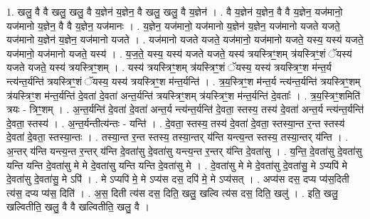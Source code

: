 \documentclass[17pt]{extarticle}
\begin{document}
1. खलु॒ वै वै खलु॒ खलु॒ वै य॒ज्ञेन॑ य॒ज्ञेन॒ वै खलु॒ खलु॒ वै य॒ज्ञेन॑ । . वै य॒ज्ञेन॑ य॒ज्ञेन॒ वै वै य॒ज्ञेन॒ यज॑मानो॒ यज॑मानो य॒ज्ञेन॒ वै वै य॒ज्ञेन॒ यज॑मानः । . य॒ज्ञेन॒ यज॑मानो॒ यज॑मानो य॒ज्ञेन॑ य॒ज्ञेन॒ यज॑मानो यजते यजते॒ यज॑मानो य॒ज्ञेन॑ य॒ज्ञेन॒ यज॑मानो यजते । . यज॑मानो यजते यजते॒ यज॑मानो॒ यज॑मानो यजते॒ यस्य॒ यस्य॑ यजते॒ यज॑मानो॒ यज॑मानो यजते॒ यस्य॑ । . य॒ज॒ते॒ यस्य॒ यस्य॑ यजते यजते॒ यस्य॑ त्रयस्त्रिꣳ॒॒शम् त्र॑यस्त्रिꣳ॒॒शं ॅयस्य॑ यजते यजते॒ यस्य॑ त्रयस्त्रिꣳ॒॒शम् । . यस्य॑ त्रयस्त्रिꣳ॒॒शम् त्र॑यस्त्रिꣳ॒॒शं ॅयस्य॒ यस्य॑ त्रयस्त्रिꣳ॒॒श म॑न्त॒र्य न्त्य॑न्त॒र्यन्ति॑ त्रयस्त्रिꣳ॒॒शं ॅयस्य॒ यस्य॑ त्रयस्त्रिꣳ॒॒श म॑न्त॒र्यन्ति॑ । . त्र॒य॒स्त्रिꣳ॒॒श म॑न्त॒र्य न्त्य॑न्त॒र्यन्ति॑ त्रयस्त्रिꣳ॒॒शम् त्र॑यस्त्रिꣳ॒॒श म॑न्त॒र्यन्ति॑ दे॒वता॑ दे॒वता॑ अन्त॒र्यन्ति॑ त्रयस्त्रिꣳ॒॒शम् त्र॑यस्त्रिꣳ॒॒श म॑न्त॒र्यन्ति॑ दे॒वताः᳚ । . त्र॒य॒स्त्रिꣳ॒॒शमिति॑ त्रयः - त्रिꣳ॒॒शम् । . अ॒न्त॒र्यन्ति॑ दे॒वता॑ दे॒वता॑ अन्त॒र्य न्त्य॑न्त॒र्यन्ति॑ दे॒वता॒ स्तस्य॒ तस्य॑ दे॒वता॑ अन्त॒र्य न्त्य॑न्त॒र्यन्ति॑ दे॒वता॒ स्तस्य॑ । . अ॒न्त॒र्यन्तीत्य॑न्तः - यन्ति॑ । . दे॒वता॒ स्तस्य॒ तस्य॑ दे॒वता॑ दे॒वता॒ स्तस्या॒न्त र॒न्त स्तस्य॑ दे॒वता॑ दे॒वता॒ स्तस्या॒न्तः । . तस्या॒न्त र॒न्त स्तस्य॒ तस्या॒न्तर् य॑न्ति यन्त्य॒न्त स्तस्य॒ तस्या॒न्तर् य॑न्ति । . अ॒न्तर् य॑न्ति यन्त्य॒न्त र॒न्तर् य॑न्ति दे॒वता॑सु दे॒वता॑सु यन्त्य॒न्त र॒न्तर् य॑न्ति दे॒वता॑सु । . य॒न्ति॒ दे॒वता॑सु दे॒वता॑सु यन्ति यन्ति दे॒वता॑सु मे मे दे॒वता॑सु यन्ति यन्ति दे॒वता॑सु मे । . दे॒वता॑सु मे मे दे॒वता॑सु दे॒वता॑सु॒ मे ऽप्यपि॑ मे दे॒वता॑सु दे॒वता॑सु॒ मे ऽपि॑ । . मे ऽप्यपि॑ मे॒ मे ऽप्य॑स दस॒ दपि॑ मे॒ मे ऽप्य॑सत् । . अप्य॑स दस॒ दप्य प्य॑स॒दिती त्य॑स॒ दप्य प्य॑स॒ दिति॑ । . अ॒स॒ दिती त्य॑स दस॒ दिति॒ खलु॒ खल्वि त्य॑स दस॒ दिति॒ खलु॑ । . इति॒ खलु॒ खल्वितीति॒ खलु॒ वै वै खल्वितीति॒ खलु॒ वै । \newline
\end{document}
